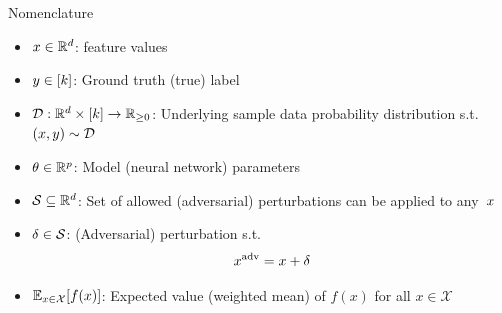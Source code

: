 \begin{frame}{Nomenclature}
    

  \begin{itemize}[<+->]
    \setlength{\itemsep}{6pt}
    \item ${x \in \mathbb{R}^{d}}$: feature values
    \item ${y \in {\lbrack k\rbrack}}$: Ground truth (true) label
    \item ${\mathcal{D}:\mathbb{R}^{d} \times {\lbrack k\rbrack}\rightarrow\mathbb{R}_{{\geq}0}}$: Underlying sample data probability distribution s.t.\ ${(x,y) \sim \mathcal{D}}$

    \vspace{6pt}
    \item ${\theta \in \mathbb{R}^{p}}$: Model (neural network) parameters

    \vspace{6pt}
    \item ${\mathcal{S} \subseteq \mathbb{R}^{d}}$: Set of allowed (adversarial) perturbations can be applied to any~$x$
    \item ${\delta \in \mathcal{S}}$: (Adversarial) perturbation s.t.
      \begin{equation}\label{eq:AdversarialX}
        x^{\text{adv}} = x + \delta
      \end{equation}

    \vspace{6pt}
    \item $\mathbb{E}_{x \in \mathcal{X}}\lbrack f(x)\rbrack$: Expected value (weighted mean) of $f(x)$ for all ${x \in \mathcal{X}}$
  \end{itemize}
\end{frame}
